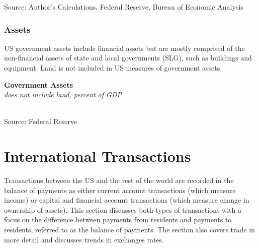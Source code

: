 \documentclass{report}
\makeatletter
\newcommand{\tbllink}[1]{\href{https://raw.githubusercontent.com/bdecon/US-chartbook/master/chartbook/data/#1}{\faTable}}
\newcommand*\short[1]{\expandafter\@gobbletwo\number\numexpr#1\relax}
\newcommand{\sbar}[4]{
		\addplot[ybar stacked, bar width=2.45pt, draw opacity=0, fill=#1] 
			table [x=#2, y=#3, col sep=comma]{#4};}
\newcommand{\dateaxisticks}{
		date coordinates in=x, axis line style={draw=none},
		xmax={2022-03-15},
		max space between ticks=40,	    
		xtick={{1990-01-01}, {1992-01-01}, {1994-01-01}, 
			{1996-01-01}, {1998-01-01}, {2000-01-01}, 
			{2002-01-01}, {2004-01-01}, {2006-01-01},
			{2008-01-01}, {2010-01-01}, {2012-01-01}, {2014-01-01},
		    {2016-01-01}, {2018-01-01}, {2020-01-01}, {2022-01-01}, 
		    {2024-01-01}, {2026-01-01}},
		minor xtick={{1989-01-01}, {1991-01-01}, {1993-01-01},
			{1995-01-01}, {1997-01-01}, {1999-01-01}, 
			{2001-01-01}, {2003-01-01}, {2005-01-01}, {2007-01-01},
		    {2009-01-01}, {2011-01-01}, {2013-01-01}, {2015-01-01},
		    {2017-01-01}, {2019-01-01}, {2021-01-01}, {2023-01-01}, 
		    {2025-01-01}, {2027-01-01}},
		enlarge y limits={0.06}, enlarge x limits={0.01},
		}
\newcommand{\bbar}[2]{extra #1 ticks = {{#2}}, extra #1 tick labels = ,
		extra #1 tick style = {grid=major, grid style={thick, black!25}},}
\newcommand{\rbars}{
		\fill[color=black!10] (axis cs:{1990-07-01},\pgfkeysvalueof{/pgfplots/ymin}) rectangle 
			(axis cs:{1991-03-01}, \pgfkeysvalueof{/pgfplots/ymax});
		\fill[color=black!10] (axis cs:{2007-12-01},\pgfkeysvalueof{/pgfplots/ymin}) rectangle 
			(axis cs:{2009-07-01}, \pgfkeysvalueof{/pgfplots/ymax});
		\fill[color=black!10] (axis cs:{2001-03-01},\pgfkeysvalueof{/pgfplots/ymin}) rectangle 
			(axis cs:{2001-11-01}, \pgfkeysvalueof{/pgfplots/ymax});
		\fill[color=black!10] (axis cs:{2020-02-01},\pgfkeysvalueof{/pgfplots/ymin}) rectangle 
			(axis cs:{2020-05-01}, \pgfkeysvalueof{/pgfplots/ymax});}
\makeatother
\begin{document}
{\begin{minipage}{0.76\textwidth}
\footnotesize{Source: Author's Calculations, Federal Reserve, Bureau of Economic Analysis} \hfill \tbllink{debt_dynamics.csv} 

\end{minipage}
\newpage
\begin{minipage}{0.76\textwidth}
\subsubsection*{Assets}
\small US government assets include financial assets but are mostly comprised of the non-financial assets of state and local governments (SLG), such as buildings and equipment. Land is not included in US measures of government assets. 


\vspace{2mm}

\normalsize \textbf{Government Assets}\\
\footnotesize{\textit{does not include land, percent of GDP}}\\
\hspace*{-2mm} \\
\footnotesize{Source: Federal Reserve} \hfill \tbllink{govassets.csv}
\end{minipage}
\newpage
\hypertarget{ext}{}
\begin{minipage}{0.76\textwidth}
\section*{International Transactions}
\small Transactions between the US and the rest of the world are recorded in the balance of payments as either current account transactions (which measure income) or capital and financial account transactions (which measure change in ownership of assets). This section discusses both types of transactions with a focus on the difference between payments from residents and payments to residents, referred to as the balance of payments. The section also covers trade in more detail and discusses trends in exchanges rates. 


\end{minipage}}
\end{document}
